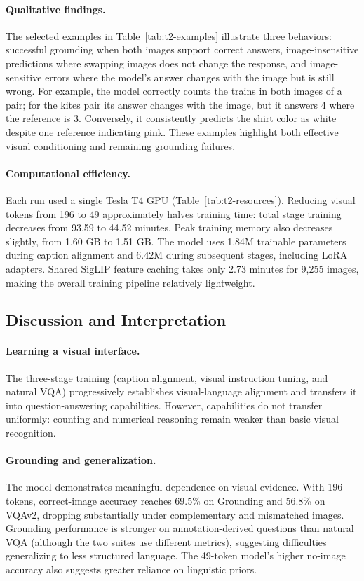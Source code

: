 \documentclass{article}
\begin{document}
\paragraph{Qualitative findings.}
The selected examples in Table~\ref{tab:t2-examples} illustrate three behaviors: successful grounding when both images support correct answers, image-insensitive predictions where swapping images does not change the response, and image-sensitive errors where the model's answer changes with the image but is still wrong. For example, the model correctly counts the trains in both images of a pair; for the kites pair its answer changes with the image, but it answers 4 where the reference is 3. Conversely, it consistently predicts the shirt color as white despite one reference indicating pink. These examples highlight both effective visual conditioning and remaining grounding failures.

\paragraph{Computational efficiency.}
Each run used a single Tesla T4 GPU (Table~\ref{tab:t2-resources}). Reducing visual tokens from 196 to 49 approximately halves training time: total stage training decreases from 93.59 to 44.52 minutes. Peak training memory also decreases slightly, from 1.60 GB to 1.51 GB. The model uses 1.84M trainable parameters during caption alignment and 6.42M during subsequent stages, including LoRA adapters. Shared SigLIP feature caching takes only 2.73 minutes for 9,255 images, making the overall training pipeline relatively lightweight.



\subsection{Discussion and Interpretation}
\label{sec:vlm-discussion}

\paragraph{Learning a visual interface.}
The three-stage training (caption alignment, visual instruction tuning, and natural VQA) progressively establishes visual-language alignment and transfers it into question-answering capabilities. However, capabilities do not transfer uniformly: counting and numerical reasoning remain weaker than basic visual recognition.

\paragraph{Grounding and generalization.}
The model demonstrates meaningful dependence on visual evidence. With 196 tokens, correct-image accuracy reaches 69.5\% on Grounding and 56.8\% on VQAv2, dropping substantially under complementary and mismatched images. Grounding performance is stronger on annotation-derived questions than natural VQA (although the two suites use different metrics), suggesting difficulties generalizing to less structured language. The 49-token model's higher no-image accuracy also suggests greater reliance on linguistic priors.
\end{document}
